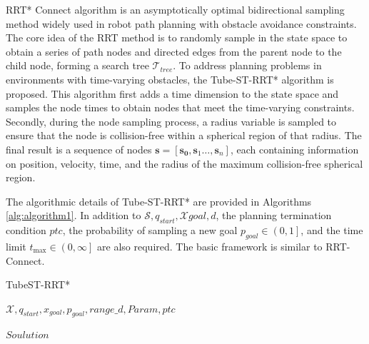 \documentclass[times,authoryear]{elsarticle}
\newcommand{\Input}{\item[\textbf{Input:}]}
\renewcommand{\Output}{\item[\textbf{Output:}]}
\begin{document}
RRT* Connect algorithm is an asymptotically optimal bidirectional sampling method widely used in robot path planning with obstacle avoidance constraints. The core idea of the RRT method is to randomly sample in the state space to obtain a series of path nodes and directed edges from the parent node to the child node, forming a search tree $\mathcal{T}_{tree }$. To address planning problems in environments with time-varying obstacles, the Tube-ST-RRT* algorithm is proposed. This algorithm first adds a time dimension to the state space and samples the node times to obtain nodes that meet the time-varying constraints. Secondly, during the node sampling process, a radius variable is sampled to ensure that the node is collision-free within a spherical region of that radius. The final result is a sequence of nodes $\boldsymbol{s} = [\boldsymbol{s_{0}},\boldsymbol{s}_{1}\dots{},\boldsymbol{s}_{n}]$, each containing information on position, velocity, time, and the radius of the maximum collision-free spherical region.

The algorithmic details of Tube-ST-RRT* are provided in Algorithms \ref{alg:algorithm1}. In addition to $\mathcal{S}, q_{start}, \mathcal{X}{goal}, d$, the planning termination condition $ptc$, the probability of sampling a new goal $p_{goal} \in \left (0, 1 \right ]$, and the time limit $t_{\max} \in \left (0, \infty \right]$ are also required. The basic framework is similar to RRT-Connect.

\begin{algorithm}[H]
	\label{alg:algorithm1}
	\caption{TubeST-RRT*}
	\begin{algorithmic}[1]
		\Input{$\mathcal{X},q_{start},x_{goal},p_{goal},range\_d,Param,ptc$  }
		\Output{$Soulution$}



		\ENDIF{}

		\ENDIF{}

		\ENDIF{}

		\ENDWHILE{}

	\end{algorithmic}
\end{algorithm}
\end{document}
